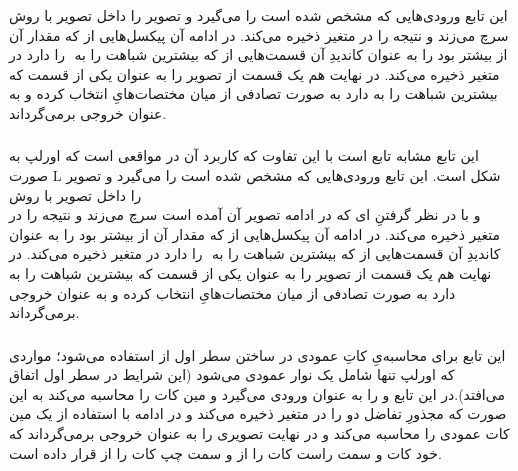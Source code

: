 \documentclass[a4paper,12pt]{article}
\begin{document}
\subsubsection*{}
 این تابع ورودی‌هایی که مشخص شده است را می‌گیرد و تصویر
 را داخل تصویر
 با روش \\
 سرچ می‌زند و نتیجه را در متغیر 
 ذخیره می‌کند. در ادامه آن پیکسل‌هایی از 
  که مقدار آن از 
  بیشتر بود را به عنوان کاندیدِ آن قسمت‌هایی از 
  که بیشترین شباهت را به 
  ‌
  را دارد در متغیر 
  ذخیره می‌کند. در نهایت هم یک قسمت از تصویر 
  را به عنوان یکی از قسمت که بیشترین شباهت را به 
  دارد به صورت تصادفی از میان مختصات‌هایِ 
   انتخاب کرده و به عنوان خروجی بر‌می‌گرداند.
   \subsubsection*{}
   این تابع مشابه تابع 
    است با این تفاوت که کاربرد آن در مواقعی است که اورلپ به صورت L شکل است. این تابع ورودی‌هایی که مشخص شده است را می‌گیرد و تصویر
   را داخل تصویر
   با روش \\
    و با در نظر گرفتنِ 
    ‌ای
    که در ادامه تصویر آن آمده است سرچ می‌زند و نتیجه را در متغیر 
   ذخیره می‌کند. در ادامه آن پیکسل‌هایی از 
   که مقدار آن از 
   بیشتر بود را به عنوان کاندیدِ آن قسمت‌هایی از 
   که بیشترین شباهت را به 
   ‌
   را دارد در متغیر 
   ذخیره می‌کند. در نهایت هم یک قسمت از تصویر 
   را به عنوان یکی از قسمت که بیشترین شباهت را به 
   دارد به صورت تصادفی از میان مختصات‌هایِ 
   انتخاب کرده و به عنوان خروجی بر‌می‌گرداند.
   \subsubsection*{}
   این تابع برای محاسبه‌یِ کاتِ عمودی در ساختن سطر اول از 
   استفاده می‌شود؛‌ مواردی که اورلپ تنها شامل یک نوار عمودی می‌شود (این شرایط در سطر اول اتفاق می‌افتد).در این تابع 
   و
   را به عنوان ورودی می‌گیرد و مین کات را محاسبه می‌کند به این صورت که مجذورِ تفاضل دو 
   را در متغیر 
   ذخیره می‌کند و در ادامه با استفاده از 
    یک مین کات عمودی را محاسبه می‌کند و در نهایت تصویری را به عنوان خروجی بر‌می‌گرداند که خود کات و سمت راست کات را از 
     و سمت چپ کات را از 
     قرار داده است.
\end{document}
